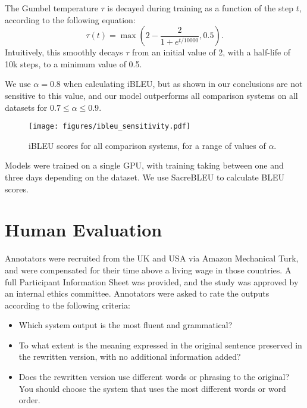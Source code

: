 \documentclass[11pt]{article}
\begin{document}
The Gumbel temperature $\tau$ is decayed during training as a function of the step $t$, according to the following equation:
\begin{equation}
  \tau(t) = \max(2 - \frac{2}{1 + e^{t/10000}}, 0.5) .
\end{equation}
Intuitively, this smoothly decays $\tau$ from an initial value of 2, with a half-life of 10k steps, to a minimum value of 0.5.

We use $\alpha=0.8$ when calculating iBLEU, but as shown in  our conclusions are not sensitive to this value, and our model outperforms all comparison systems on all datasets for $0.7 \leq \alpha \leq 0.9$.

\begin{figure*}[t!]
    \centering
    \texttt{[image: figures/ibleu\_sensitivity.pdf]}
    \vspace{-0.2cm}
    \caption{iBLEU scores for all comparison systems, for a range of values of $\alpha$.}
    \label{fig:ibleusens}
\end{figure*}

Models were trained on a single GPU, with training taking between one and three days depending on the dataset. We use SacreBLEU \cite{post-2018-call} to calculate BLEU scores.

\section{Human Evaluation}
\label{app:humeval}

Annotators were recruited from the UK and USA via Amazon Mechanical Turk, and were compensated for their time above a living wage in those countries. A full Participant Information Sheet was provided, and the study was approved by an internal ethics committee. Annotators were asked to rate the outputs according to the following criteria:

\begin{itemize}
    \item Which system output is the most fluent and grammatical?
    \item To what extent is the meaning expressed in the original sentence preserved in the rewritten version, with no additional information added?
    \item Does the rewritten version use different words or phrasing to the original? You should choose the system that uses the most different words or word order.
\end{itemize}
\end{document}
